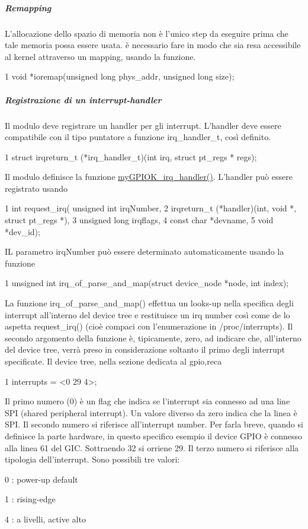\subparagraph*{Remapping}

L'allocazione dello spazio di memoria non è l'unico step da eseguire prima che tale memoria possa essere usata. è necessario fare in modo che sia resa accessibile al kernel attraverso un mapping, usando la funzione. 
\begin{DoxyCode}
1 void *ioremap(unsigned long phys\_addr, unsigned long size);
\end{DoxyCode}


\subparagraph*{Registrazione di un interrupt-\/handler}

Il modulo deve registrare un handler per gli interrupt. L'handler deve essere compatibile con il tipo puntatore a funzione irq\+\_\+handler\+\_\+t, così definito. 
\begin{DoxyCode}
1 struct irqreturn\_t (*irq\_handler\_t)(int irq, struct pt\_regs * regs);
\end{DoxyCode}
 Il modulo definisce la funzione \hyperlink{group___linux-_driver_ga2fc230a12a97aa63e43b2dc4aec73511}{my\+G\+P\+I\+O\+K\+\_\+irq\+\_\+handler()}. L'handler può essere registrato usando 
\begin{DoxyCode}
1 int request\_irq(    unsigned int irqNumber,
2                     irqreturn\_t (*handler)(int, void *, struct pt\_regs *),
3                     unsigned long irqflags,
4                     const char *devname,
5                     void *dev\_id);
\end{DoxyCode}
 I\+L parametro irq\+Number può essere determinato automaticamente usando la funzione 
\begin{DoxyCode}
1 unsigned int irq\_of\_parse\_and\_map(struct device\_node *node, int index);
\end{DoxyCode}
 La funzione irq\+\_\+of\+\_\+parse\+\_\+and\+\_\+map() effettua un looks-\/up nella specifica degli interrupt all'interno del device tree e restituisce un irq number così come de lo aspetta request\+\_\+irq() (cioè compaci con l'enumerazione in /proc/interrupts). Il secondo argomento della funzione è, tipicamente, zero, ad indicare che, all'interno del device tree, verrà preso in considerazione soltanto il primo degli interrupt specificate. Il device tree, nella sezione dedicata al gpio,reca 
\begin{DoxyCode}
1 interrupts = <0 29 4>;
\end{DoxyCode}
 Il primo numero (0) è un flag che indica se l'interrupt sia connesso ad una line S\+P\+I (shared peripheral interrupt). Un valore diverso da zero indica che la linea è S\+P\+I. Il secondo numero si riferisce all'interrupt number. Per farla breve, quando si definisce la parte hardware, in questo specifico esempio il device G\+P\+I\+O è connesso alla linea 61 del G\+I\+C. Sottraendo 32 si orriene 29. Il terzo numero si riferisce alla tipologia dell'interrupt. Sono possibili tre valori\+:
\begin{DoxyItemize}
\item 0 \+: power-\/up default
\item 1 \+: rising-\/edge
\item 4 \+: a livelli, active alto
\end{DoxyItemize}

